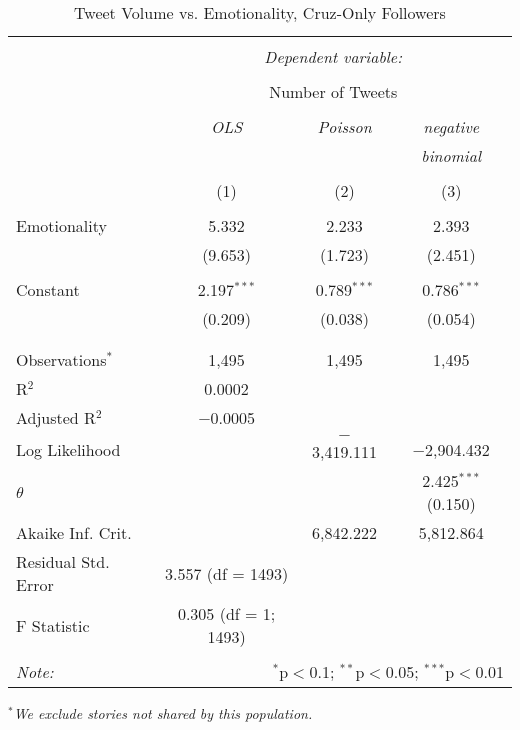 \begin{table}[!htbp] \centering 
  \caption{Tweet Volume vs. Emotionality, Cruz-Only Followers} 
  \label{} 
    \begin{tabular}{@{\extracolsep{5pt}}lccc} 
    \\[-1.8ex]\hline 
    \hline \\[-1.8ex] 
     & \multicolumn{3}{c}{\textit{Dependent variable:}} \\ 
    \cline{2-4} 
    \\[-1.8ex] & \multicolumn{3}{c}{Number of Tweets} \\ 
    \\[-1.8ex] & \textit{OLS} & \textit{Poisson} & \textit{negative} \\ 
     & \textit{} & \textit{} & \textit{binomial} \\ 
    \\[-1.8ex] & (1) & (2) & (3)\\ 
    \hline \\[-1.8ex] 
     Emotionality & 5.332 & 2.233 & 2.393 \\ 
      & (9.653) & (1.723) & (2.451) \\ 
      & & & \\ 
     Constant & 2.197$^{***}$ & 0.789$^{***}$ & 0.786$^{***}$ \\ 
      & (0.209) & (0.038) & (0.054) \\ 
      & & & \\ 
    \hline \\[-1.8ex] 
    Observations$^{*}$ & 1,495 & 1,495 & 1,495 \\ 
    R$^{2}$ & 0.0002 &  &  \\ 
    Adjusted R$^{2}$ & $-$0.0005 &  &  \\ 
    Log Likelihood &  & $-$3,419.111 & $-$2,904.432 \\ 
    $\theta$ &  &  & 2.425$^{***}$  (0.150) \\ 
    Akaike Inf. Crit. &  & 6,842.222 & 5,812.864 \\ 
    Residual Std. Error & 3.557 (df = 1493) &  &  \\ 
    F Statistic & 0.305 (df = 1; 1493) &  &  \\ 
    \hline 
    \hline \\[-1.8ex] 
    \textit{Note:}  & \multicolumn{3}{r}{$^{*}$p$<$0.1; $^{**}$p$<$0.05; $^{***}$p$<$0.01} \\ 
    \end{tabular} 
\end{table} 
\emph{$^{*}$We exclude stories not shared by this population.} 
\newpage 

